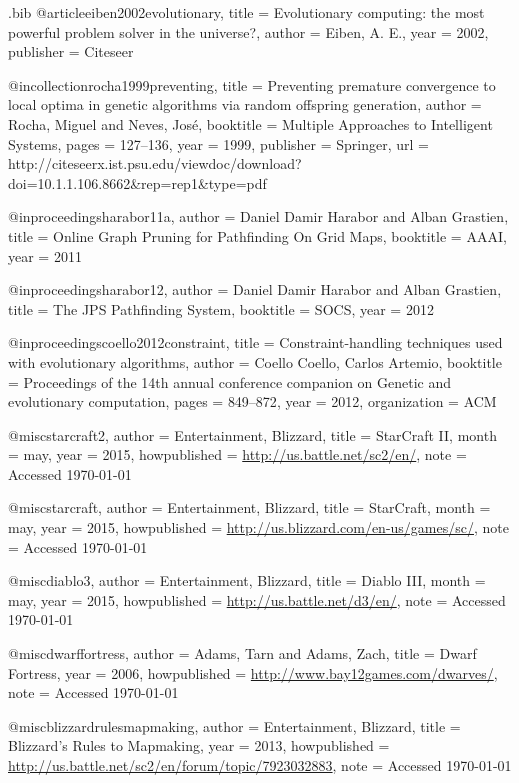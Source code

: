 \begin{filecontents*}{\jobname.bib}
@article{eiben2002evolutionary,
	title		= {{E}volutionary {c}omputing: {t}he {m}ost {p}owerful {p}roblem {s}olver in the {u}niverse?},
	author	= {Eiben, A. E.},
	year		= {2002},
	publisher	= {Citeseer}
}

@incollection{rocha1999preventing,
	title		= {{P}reventing {p}remature {c}onvergence to {l}ocal {o}ptima in {g}enetic {a}lgorithms via {r}andom {o}ffspring {g}eneration},
	author	= {Rocha, Miguel and Neves, Jos{\'e}},
	booktitle	= {Multiple Approaches to Intelligent Systems},
	pages		= {127--136},
	year		= {1999},
	publisher	= {Springer},
	url 		= {http://citeseerx.ist.psu.edu/viewdoc/download?doi=10.1.1.106.8662&rep=rep1&type=pdf}
}

@inproceedings{harabor11a,
	author	= {Daniel Damir Harabor and Alban Grastien},
	title     	= {{O}nline {G}raph {P}runing for {P}athfinding {O}n {G}rid {M}aps},
	booktitle 	= {AAAI},
	year      	= {2011}
}

@inproceedings{harabor12,
	author    	= {Daniel Damir Harabor and Alban Grastien},
	title     	= {{T}he {J}{P}{S} {P}athfinding {S}ystem},
	booktitle 	= {SOCS},
	year      	= {2012}
}

@inproceedings{coello2012constraint,
	title		= {{C}onstraint-{h}andling {t}echniques used with {e}volutionary {a}lgorithms},
	author	= {Coello Coello, Carlos Artemio},
	booktitle	= {Proceedings of the 14th annual conference companion on Genetic and evolutionary computation},
	pages		= {849--872},
	year		= {2012},
	organization	= {ACM}
}

@misc{starcraft2,
	author 	= {Entertainment, Blizzard},
	title 		= {StarCraft II},
	month 	= may,
	year 		= {2015},
	howpublished = {\url{http://us.battle.net/sc2/en/}},
	note  		= {Accessed \today}
}

@misc{starcraft,
	author 	= {Entertainment, Blizzard},
	title 		= {StarCraft},
	month 	= may,
	year 		= {2015},
	howpublished = {\url{http://us.blizzard.com/en-us/games/sc/}},
	note  		= {Accessed \today}
}

@misc{diablo3,
	author 	= {Entertainment, Blizzard},
	title 		= {Diablo III},
	month 	= may,
	year 		= {2015},
	howpublished = {\url{http://us.battle.net/d3/en/}},
	note  		= {Accessed \today}
}

@misc{dwarffortress,
	author 	= {Adams, Tarn and Adams, Zach},
	title 		= {{D}warf {F}ortress},
	year 		= {2006}, 
	howpublished = {\url{http://www.bay12games.com/dwarves/}},
	note		= {Accessed \today}
}

@misc{blizzardrulesmapmaking,
	author 	= {Entertainment, Blizzard},
	title 		= {Blizzard's Rules to Mapmaking},
	year 		= {2013},
	howpublished = {\url{http://us.battle.net/sc2/en/forum/topic/7923032883}},
	note  		= {Accessed \today}
}


\end{filecontents*}
